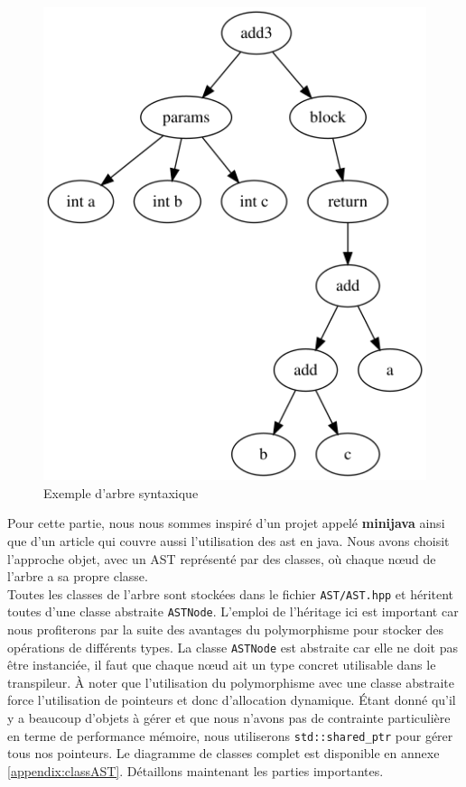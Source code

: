 \documentclass[a4paper]{article}%
\begin{document}
\begin{figure}[h]
  \begin{center}
  \includegraphics[scale=0.4]{img/ast1.png}
  \caption{Exemple d'arbre syntaxique}
  \end{center}
\end{figure}

Pour cette partie, nous nous sommes inspiré d'un projet appelé \textbf{minijava}
\cite{minijava} ainsi que d'un article \cite{gagnon1998sablecc} qui couvre aussi
l'utilisation des \gls{ast} en java. Nous avons choisit l'approche objet, avec un AST
représenté par des classes, où chaque nœud de l'arbre a sa propre classe.\\

Toutes les classes de l'arbre sont stockées dans le fichier
\lstinline{AST/AST.hpp} et héritent toutes d'une classe abstraite
\lstinline{ASTNode}. L'emploi de l'héritage ici est important car
nous profiterons par la suite des avantages du polymorphisme pour stocker des
opérations de différents types. La classe \lstinline{ASTNode} est abstraite car
elle ne doit pas être instanciée, il faut que chaque nœud ait un type concret
utilisable dans le transpileur. À noter que l'utilisation du polymorphisme
avec une classe abstraite force l'utilisation de pointeurs et donc d'allocation
dynamique. Étant donné qu'il y a beaucoup d'objets à gérer et que nous n'avons
pas de contrainte particulière en terme de performance mémoire, nous utiliserons
\lstinline{std::shared_ptr} pour gérer tous nos pointeurs. Le diagramme de
classes complet est disponible en annexe \ref{appendix:classAST}. Détaillons
maintenant les parties importantes.
\end{document}
